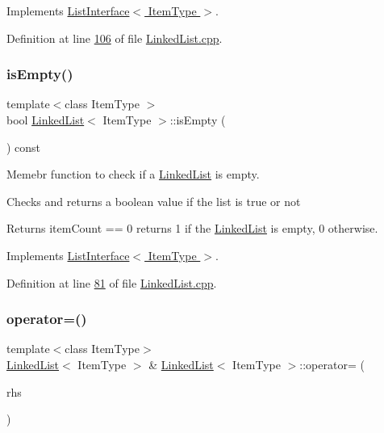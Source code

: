 Implements \hyperlink{classListInterface_a5b2f86954a86172699a3495982c38e77}{List\+Interface$<$ Item\+Type $>$}.



Definition at line \hyperlink{LinkedList_8cpp_source_l00106}{106} of file \hyperlink{LinkedList_8cpp_source}{Linked\+List.\+cpp}.

\mbox{\label{classLinkedList_a008e916c3d51d28b4cc9c8cdf3e9d921}} 
\subsubsection{\texorpdfstring{is\+Empty()}{isEmpty()}}
{\footnotesize\ttfamily template$<$class Item\+Type $>$ \\
bool \hyperlink{classLinkedList}{Linked\+List}$<$ Item\+Type $>$\+::is\+Empty (\begin{DoxyParamCaption}{ }\end{DoxyParamCaption}) const\hspace{0.3cm}{\ttfamily [virtual]}}



Memebr function to check if a \hyperlink{classLinkedList}{Linked\+List} is empty. 

Checks and returns a boolean value if the list is true or not \begin{DoxyReturn}{Returns}
item\+Count == 0 returns 1 if the \hyperlink{classLinkedList}{Linked\+List} is empty, 0 otherwise. 
\end{DoxyReturn}


Implements \hyperlink{classListInterface_a924f91e7f81d7dcd3fda79bbcc671394}{List\+Interface$<$ Item\+Type $>$}.



Definition at line \hyperlink{LinkedList_8cpp_source_l00081}{81} of file \hyperlink{LinkedList_8cpp_source}{Linked\+List.\+cpp}.

\mbox{\label{classLinkedList_a25b0fba69e66b0fa409be992530029bc}} 
\subsubsection{\texorpdfstring{operator=()}{operator=()}}
{\footnotesize\ttfamily template$<$class Item\+Type$>$ \\
\hyperlink{classLinkedList}{Linked\+List}$<$ Item\+Type $>$ \& \hyperlink{classLinkedList}{Linked\+List}$<$ Item\+Type $>$\+::operator= (\begin{DoxyParamCaption}\item[{const \hyperlink{classLinkedList}{Linked\+List}$<$ Item\+Type $>$ \&}]{rhs }\end{DoxyParamCaption})}



